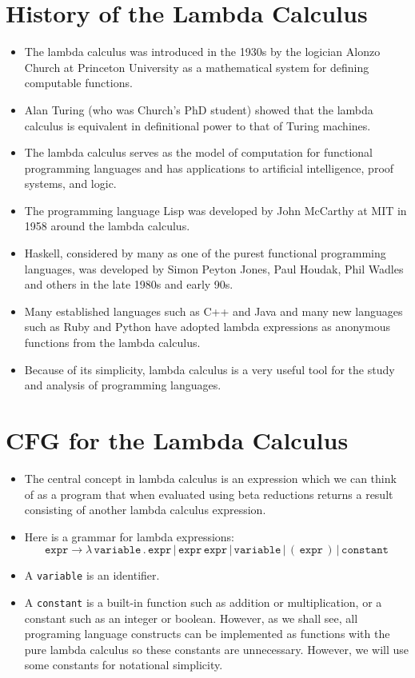 \documentclass[]{article}
\begin{document}
\section{History of the Lambda Calculus}
\begin{itemize}
\item The lambda calculus was introduced in the 1930s by the logician Alonzo Church at Princeton University as a mathematical system for defining computable functions.
\item Alan Turing (who was Church's PhD student) showed that the lambda calculus is equivalent in definitional power to that of Turing machines.
\item The lambda calculus serves as the model of computation for functional programming languages and has applications to artificial intelligence, proof systems, and logic.
\item The programming language Lisp was developed by John McCarthy at MIT in 1958 around the lambda calculus.
\item Haskell, considered by many as one of the purest functional programming languages, was developed by Simon Peyton Jones, Paul Houdak, Phil Wadles and others in the late 1980s and early 90s.
\item Many established languages such as C++ and Java and many new languages such as Ruby and Python have adopted lambda expressions as anonymous functions from the lambda calculus.
\item Because of its simplicity, lambda calculus is a very useful tool for the study and analysis of programming languages.
\end{itemize}

\section{CFG for the Lambda Calculus}
\begin{itemize}
\item The central concept in lambda calculus is an expression which we can think of as a program that when evaluated using beta reductions returns a result consisting of another lambda calculus expression.
\item Here is a grammar for lambda expressions:
\[\texttt{expr}\rightarrow\lambda\,\texttt{variable}\,.\,\texttt{expr}\,|\,\texttt{expr}\,\texttt{expr}\,|\,\texttt{variable}\,|\,(\,\texttt{expr}\,)\,|\,\texttt{constant} \]
\item A \texttt{variable} is an identifier.
\item A \texttt{constant} is a built-in function such as addition or multiplication, or a constant such as an integer or boolean. However, as we shall see, all programing language constructs can be implemented as functions with the pure lambda calculus so these constants are unnecessary. However, we will use some constants for notational simplicity.
\end{itemize}
\end{document}
